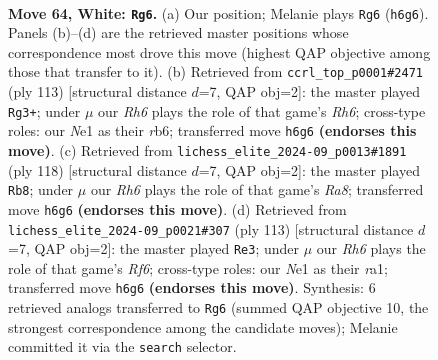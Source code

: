 \documentclass[11pt]{article}
\begin{document}
\clearpage

\begin{figure}[p]\centering
\begin{subfigure}{0.46\textwidth}\centering
\resizebox{\linewidth}{!}{%
\newchessgame
\chessboard[
  setfen={8/8/7R/7P/8/2k5/5K2/4N3 w - - 0 64},
  showmover=false,
  pgfstyle=straightmove, color=movearrow, markmove={h6-g6}
]}
\caption{}
\end{subfigure}\hfill
\begin{subfigure}{0.46\textwidth}\centering
\resizebox{\linewidth}{!}{%
\newchessgame
\chessboard[
  setfen={8/8/1R6/5k2/7p/7r/8/6K1 b - - 0 57},
  showmover=false,
  pgfstyle=straightmove, color=movearrow, markmove={h3-g3}
]}
\caption{}
\end{subfigure}
\\[4pt]
\begin{subfigure}{0.46\textwidth}\centering
\resizebox{\linewidth}{!}{%
\newchessgame
\chessboard[
  setfen={R7/P7/6K1/8/2k5/8/8/8 w - - 1 60},
  showmover=false,
  pgfstyle=straightmove, color=movearrow, markmove={a8-b8}
]}
\caption{}
\end{subfigure}\hfill
\begin{subfigure}{0.46\textwidth}\centering
\resizebox{\linewidth}{!}{%
\newchessgame
\chessboard[
  setfen={8/8/8/5k2/5p2/5r2/3K4/R7 b - - 7 57},
  showmover=false,
  pgfstyle=straightmove, color=movearrow, markmove={f3-e3}
]}
\caption{}
\end{subfigure}
\caption{\textbf{Move 64, White: \texttt{Rg6}.} (a) Our position; Melanie plays \texttt{Rg6} (\texttt{h6g6}). Panels (b)--(d) are the retrieved master positions whose correspondence most drove this move (highest QAP objective among those that transfer to it). (b) Retrieved from \texttt{ccrl\_top\_p0001\#2471} (ply 113) [structural distance $d$=7, QAP obj=2]: the master played \texttt{Rg3+}; under $\mu$ our \emph{Rh6} plays the role of that game's \emph{Rh6}; cross-type roles: our \emph{N}e1 as their \emph{r}b6; transferred move \texttt{h6g6} \textbf{(endorses this move)}. (c) Retrieved from \texttt{lichess\_elite\_2024-09\_p0013\#1891} (ply 118) [structural distance $d$=7, QAP obj=2]: the master played \texttt{Rb8}; under $\mu$ our \emph{Rh6} plays the role of that game's \emph{Ra8}; transferred move \texttt{h6g6} \textbf{(endorses this move)}. (d) Retrieved from \texttt{lichess\_elite\_2024-09\_p0021\#307} (ply 113) [structural distance $d$=7, QAP obj=2]: the master played \texttt{Re3}; under $\mu$ our \emph{Rh6} plays the role of that game's \emph{Rf6}; cross-type roles: our \emph{N}e1 as their \emph{r}a1; transferred move \texttt{h6g6} \textbf{(endorses this move)}. Synthesis: 6 retrieved analogs transferred to \texttt{Rg6} (summed QAP objective 10, the strongest correspondence among the candidate moves); Melanie committed it via the \texttt{search} selector.}
\label{fig:thought-m126}
\end{figure}
\end{document}
